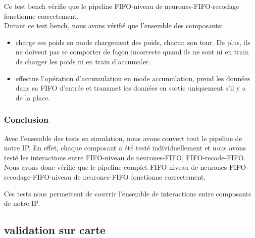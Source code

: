 Ce test bench vérifie que le pipeline FIFO-niveau de neurones-FIFO-recodage
fonctionne correctement.\\

Durant ce test bench, nous avons vérifié que l'ensemble des composants:
\begin{itemize}
	\item charge ses poids en mode chargement des poids, chacun son tour.
	De plus, ils ne doivent pas se comporter de façon incorrecte quand
	ils ne sont ni en train de charger les poids ni en train d'accumuler.
	\item effectue l'opération d'accumulation en mode accumulation, prend
	les données dans sa FIFO d'entrée et transmet les données en sortie
	uniquement s'il y a de la place.
\end{itemize}

\subsubsection{Conclusion}

Avec l'ensemble des tests en simulation, nous avons couvert tout le pipeline de
notre IP. En effet, chaque composant a été testé individuellement et nous avons
testé les interactions entre FIFO-niveau de neurones-FIFO, FIFO-recode-FIFO.
Nous avons donc vérifié que le pipeline complet
FIFO-niveau de neurones-FIFO-recodage-FIFO-niveau de neurones-FIFO fonctionne
correctement.

Ces tests nous permettent de couvrir l'ensemble de interactions entre composants
de notre IP.

\subsection{validation sur carte}

